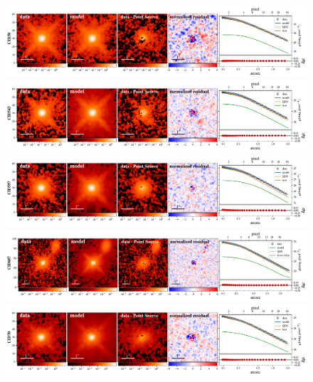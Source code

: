 \documentclass[apj]{emulateapj}
\begin{document}
\begin{figure}
\centering
{
\includegraphics[height=0.25\textwidth]{fig/best_fit_CID50_SB_profile.pdf}
\includegraphics[height=0.25\textwidth]{fig/best_fit_CID543_SB_profile.pdf}
\includegraphics[height=0.25\textwidth]{fig/best_fit_CID597_SB_profile.pdf}
\includegraphics[height=0.25\textwidth]{fig/best_fit_CID607_SB_profile.pdf}
\includegraphics[height=0.25\textwidth]{fig/best_fit_CID70_SB_profile.pdf}
}
\end{figure} 
\end{document}

